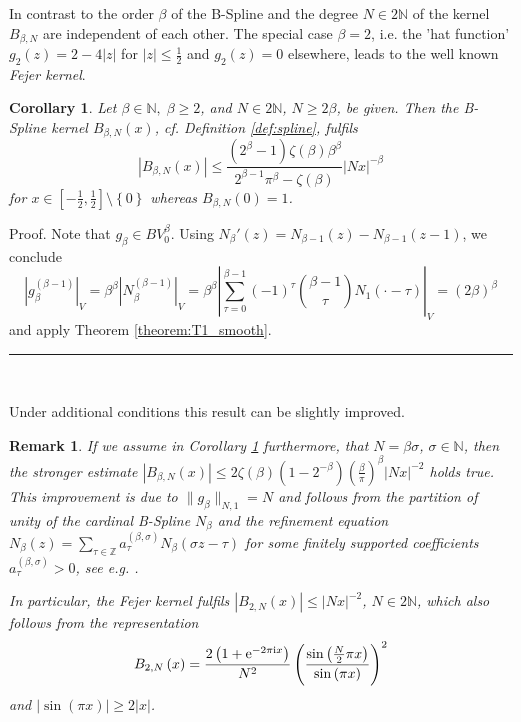 \documentclass[11pt,a4paper,bibtotoc]{scrartcl}
\def\N{\mathbb{N}}
\def\Z{\mathbb{Z}}
\def\ti{\mbox{\scriptsize{\rm i}}}
\newcommand{\eim}[1]{{\rm e}^{-2\pi{\ti} #1}}
\renewcommand{\Box}{\hspace*{0ex} \hfill \rule{1.5ex}{1.5ex} \\ \goodbreak}
\newtheorem{remark}[theorem]{Remark}
\newtheorem{corollary}[theorem]{Corollary}
\newenvironment{Remark}{\goodbreak \begin{remark}\rm}{\end{remark}}
\newenvironment{Corollary}{\goodbreak \begin{corollary}\rm}{\end{corollary}}
\numberwithin{equation}{section}
\numberwithin{table}{section}
\numberwithin{figure}{section}
\begin{document}
In contrast to \cite{NaSiWa98} the order $\beta$ of the B-Spline and the
degree $N\in 2\N$ of the kernel $B_{\beta,N}$ are independent of each other.
The special case $\beta=2$, i.e. the 'hat function' $g_2(z)=2-4|z|$ for
$|z|\le \frac{1}{2}$ and $g_2(z)=0$ elsewhere, leads to the well known {\em
  Fejer kernel}.

\begin{Corollary}\label{cor:spline}
  Let $\beta \in \mathbb{N},\;\beta\ge 2$, and $N\in2\mathbb{N}$, $N\ge
  2\beta$, be given.
  Then the B-Spline kernel $B_{\beta,N}(x)$, cf. Definition \ref{def:spline},
  fulfils
  \begin{equation*}
    \left| B_{\beta,N}\left(x\right)\right| \le
    \frac{\left(2^{\beta}-1\right)\zeta\left(\beta\right) \beta^{\beta}
    }{2^{\beta-1}\pi^{\beta}-\zeta\left(\beta\right)}
    \left|Nx\right|^{-\beta}
  \end{equation*}
  for $x\in\left[-\frac{1}{2},\frac{1}{2}\right]\setminus \left\{0\right\}$
  whereas $B_{\beta,N}(0)=1$.
\end{Corollary}

Proof. Note that $g_{\beta} \in BV_0^{\beta}$.
Using $N_{\beta}'(z)=N_{\beta-1}(z)-N_{\beta-1}(z-1)$, we conclude
\begin{equation*}
  \left|g_{\beta}^{\left(\beta-1\right)}\right|_V
  =\beta^{\beta}\left|N_{\beta}^{\left(\beta-1\right)}\right|_V
  =\beta^{\beta}\left|\sum_{\tau=0}^{\beta-1} \left(-1\right)^{\tau} {\beta-1
  \choose \tau} N_1\left(\cdot-\tau\right)\right|_V
  =\left(2\beta\right)^{\beta}
\end{equation*}
and apply Theorem \ref{theorem:T1_smooth}.
\Box

Under additional conditions this result can be slightly improved.
\begin{Remark}
  If we assume in Corollary \ref{cor:spline} furthermore, that
  $N=\beta\sigma$, $\sigma\in \N$, then the stronger estimate
  $|B_{\beta,N}(x)| \le 2\zeta(\beta)(1-2^{-\beta})
  (\frac{\beta}{\pi})^{\beta}|Nx|^{-2}$ holds true.
  This improvement is due to $\|g_{\beta}\|_{N,1}=N$ and follows from the
  partition of unity of the cardinal B-Spline $N_{\beta}$ and the refinement
  equation $N_{\beta}(z)=\sum_{\tau\in \Z} a_{\tau}^{(\beta,\sigma)}
  N_{\beta}(\sigma z - \tau)$ for some finitely supported coefficients
  $a_{\tau}^{(\beta,\sigma)}>0$, see e.g. \cite[pp. 8]{Chui88}.

  In particular, the Fejer kernel fulfils $|B_{2,N}(x)| \le |Nx|^{-2}$, $N\in
  2\N$, which also follows from the representation
  \begin{equation*}
    B_{2,N}\left(x\right)=\frac{2\left(1+\eim{x}\right)}{N^2}
    \left(\frac{\sin\left(\frac{N}{2} \pi x\right)}{\sin 
        \left(\pi x\right)}\right)^{2}
  \end{equation*}
  and $|\sin(\pi x)|\ge 2|x|$.
\end{Remark}
\end{document}
